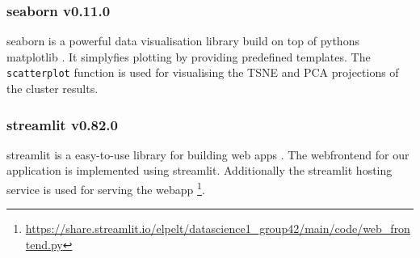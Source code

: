 \subsubsection[seaborn]{seaborn v0.11.0}
seaborn is a powerful data visualisation library build on top of pythons matplotlib \cite{seaborn}. It simplyfies plotting by providing predefined templates.  The \texttt{scatterplot} function is used for visualising the TSNE and PCA projections of the cluster results.

\subsubsection[streamlit]{streamlit v0.82.0}
streamlit is a easy-to-use library for building web apps \cite{streamlit}. The webfrontend for our application is implemented using streamlit. Additionally the streamlit hosting service is used for serving the webapp \footnote{\url{https://share.streamlit.io/elpelt/datascience1_group42/main/code/web_frontend.py}}.
